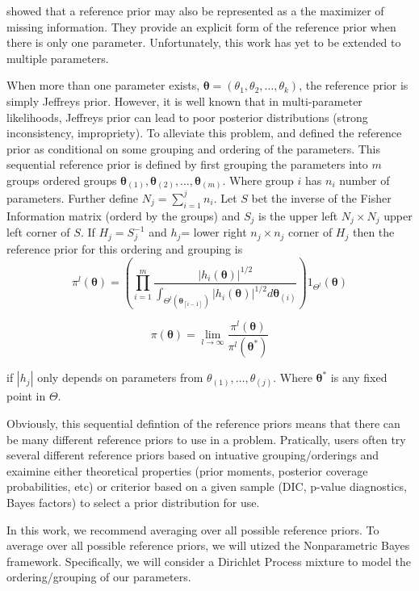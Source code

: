 \documentclass[11pt,a4paper,notitlepage]{article}
\begin{document}
\cite{BergerBernardoSun2009} showed that a reference prior may also be
represented as a the maximizer of missing information.  They provide
an explicit form of the reference prior when there is only one parameter. 
Unfortunately, this work has yet to be extended to multiple parameters.

When more than one parameter exists, $\boldsymbol{\theta} = (\theta_1,
\theta_2, \ldots, \theta_k)$, the reference prior is simply Jeffreys
prior.  However, it is well known that in multi-parameter likelihoods,
Jeffreys prior can lead to poor posterior distributions (strong
inconsistency, impropriety).  To alleviate this problem,
\cite{BergerBernardo1992} and \cite{BergerBernardo1992b} defined the
reference prior as conditional on some grouping and ordering of the
parameters.  This sequential reference prior is defined by first
grouping the parameters into $m$ groups ordered groups
$\boldsymbol{\theta}_{(1)}, \boldsymbol{\theta}_{(2)}, \ldots,
\boldsymbol{\theta}_{(m)}$. Where group $i$ has $n_i$ number of
parameters. Further define $N_j = \sum_{i=1}^jn_i$. Let $S$ bet the
inverse of the Fisher Information matrix (orderd by the groups) and
$S_j$ is the upper left $N_j\times N_j$ upper left corner of $S$. If
$H_j=S_j^{-1}$ and $h_j$= lower right $n_j\times n_j$ corner of $H_j$
then the reference prior for this ordering and grouping is
\[
\pi^l(\boldsymbol{\theta}) = \left(\prod_{i=1}^m \frac{|h_i(\boldsymbol{\theta})|^{1/2}}{\int_{\Theta^l(\boldsymbol{\theta}_{[i-1]})}|h_i(\boldsymbol{\theta})|^{1/2}d\boldsymbol{\theta}_{(i)}}\right) 1_{\Theta^l}(\boldsymbol{\theta})
\]

\[
\pi(\boldsymbol{\theta}) = \lim_{l \to \infty} \frac{\pi^l(\boldsymbol{\theta})}{\pi^l(\boldsymbol{\theta^*})}
\]

if $|h_j|$ only depends on parameters from $\theta_{(1)},\ldots, \theta_{(j)}$.
Where $\boldsymbol{\theta^*}$ is any fixed point in $\Theta$. 

Obviously, this sequential defintion of the reference priors means
that there can be many different reference priors to use in a problem.
Pratically, users often try several different reference priors based
on intuative grouping/orderings and exaimine either theoretical
properties (prior moments, posterior coverage probabilities, etc) or
criterior based on a given sample (DIC, p-value diagnostics, Bayes
factors) to select a prior distribution for use.

In this work, we recommend averaging over all possible reference
priors.  To average over all possible reference priors, we will utized
the Nonparametric Bayes framework.  Specifically, we will consider a
Dirichlet Process mixture to model the ordering/grouping of our
parameters.
\end{document}
